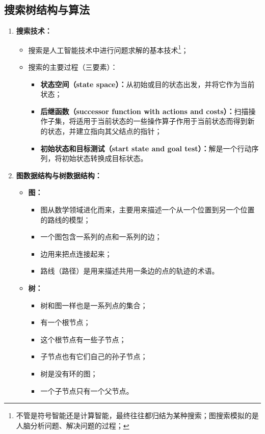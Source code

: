 \documentclass[../main.tex]{subfiles}
\begin{document}
\subsection{搜索树结构与算法}\label{sec:search-tree-algorithm}
\begin{enumerate}
    \item \textbf{搜索技术：}
    \begin{itemize}
        \item 搜索是人工智能技术中进行问题求解的基本技术\footnote{不管是符号智能还是计算智能，最终往往都归结为某种搜索；图搜索模拟的是人脑分析问题、解决问题的过程；}；
        \item 搜索的主要过程（三要素）：
        \begin{itemize}
            \item \textbf{状态空间（state space）：}从初始或目的状态出发，并将它作为当前状态；
            \item \textbf{后继函数（successor function with actions and costs）：}扫描操作子集，将适用于当前状态的一些操作算子作用于当前状态而得到新的状态，并建立指向其父结点的指针；
            \item \textbf{初始状态和目标测试（start state and goal test）：}解是一个行动序列，将初始状态转换成目标状态。
        \end{itemize}
    \end{itemize}

    \item \textbf{图数据结构与树数据结构：}
    \begin{itemize}
        \item \textbf{图：}
        \begin{itemize}
            \item 图从数学领域进化而来，主要用来描述一个从一个位置到另一个位置的路线的模型；
            \item 一个图包含一系列的点和一系列的边；
            \item 边用来把点连接起来；
            \item 路线（路径）是用来描述共用一条边的点的轨迹的术语。
        \end{itemize}
        \item \textbf{树：}
        \begin{itemize}
            \item 树和图一样也是一系列点的集合；
            \item 有一个根节点；
            \item 这个根节点有一些子节点；
            \item 子节点也有它们自己的孙子节点；
            \item 树是没有环的图；
            \item 一个子节点只有一个父节点。
        \end{itemize}
    \end{itemize}


\end{enumerate}
\end{document}
